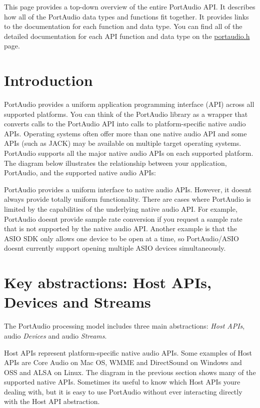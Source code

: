 This page provides a top-\/down overview of the entire Port\+Audio A\+PI. It describes how all of the Port\+Audio data types and functions fit together. It provides links to the documentation for each function and data type. You can find all of the detailed documentation for each A\+PI function and data type on the \hyperlink{portaudio_8h}{portaudio.\+h} page.\hypertarget{api_overview_introduction}{}\section{Introduction}\label{api_overview_introduction}
Port\+Audio provides a uniform application programming interface (A\+PI) across all supported platforms. You can think of the Port\+Audio library as a wrapper that converts calls to the Port\+Audio A\+PI into calls to platform-\/specific native audio A\+P\+Is. Operating systems often offer more than one native audio A\+PI and some A\+P\+Is (such as J\+A\+CK) may be available on multiple target operating systems. Port\+Audio supports all the major native audio A\+P\+Is on each supported platform. The diagram below illustrates the relationship between your application, Port\+Audio, and the supported native audio A\+P\+Is\+:



Port\+Audio provides a uniform interface to native audio A\+P\+Is. However, it doesn\textquotesingle{}t always provide totally uniform functionality. There are cases where Port\+Audio is limited by the capabilities of the underlying native audio A\+PI. For example, Port\+Audio doesn\textquotesingle{}t provide sample rate conversion if you request a sample rate that is not supported by the native audio A\+PI. Another example is that the A\+S\+IO S\+DK only allows one device to be open at a time, so Port\+Audio/\+A\+S\+IO doesn\textquotesingle{}t currently support opening multiple A\+S\+IO devices simultaneously.\hypertarget{api_overview_key_abstractions}{}\section{Key abstractions\+: Host A\+P\+Is, Devices and Streams}\label{api_overview_key_abstractions}
The Port\+Audio processing model includes three main abstractions\+: {\itshape Host A\+P\+Is}, audio {\itshape Devices} and audio {\itshape Streams}.

Host A\+P\+Is represent platform-\/specific native audio A\+P\+Is. Some examples of Host A\+P\+Is are Core Audio on Mac OS, W\+M\+ME and Direct\+Sound on Windows and O\+SS and A\+L\+SA on Linux. The diagram in the previous section shows many of the supported native A\+P\+Is. Sometimes it\textquotesingle{}s useful to know which Host A\+P\+Is you\textquotesingle{}re dealing with, but it is easy to use Port\+Audio without ever interacting directly with the Host A\+PI abstraction.

